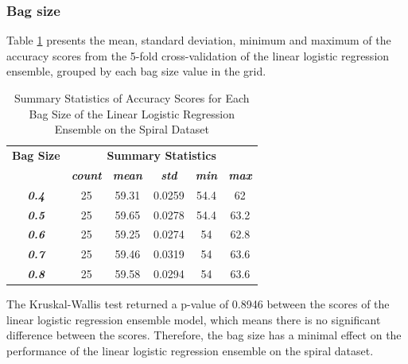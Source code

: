 \documentclass[10pt, conference]{IEEEtran}
\begin{document}
\subsubsection{Bag size}

Table \ref{table: S_bagsize_linear_performance_metrics} presents the mean, standard deviation, minimum and maximum of the
accuracy scores from the 5-fold cross-validation of the linear logistic regression ensemble, grouped by each bag size
value in the grid.
\begin{table}[H]
    \caption{Summary Statistics of Accuracy Scores for Each Bag Size of the Linear Logistic Regression Ensemble on the Spiral Dataset}
    \begin{center}
        \begin{tabular}{|c||c|c|c|c|c|}
            \hline
            \textbf{Bag Size}&\multicolumn{5}{|c|}{\textbf{Summary Statistics}} \\
            \cline{2-6}
                       &\textbf{\textit{count}} & \textbf{\textit{mean}} & \textbf{\textit{std}} & \textbf{\textit{min}} & \textbf{\textit{max}}\\
            \hline
            \textbf{\textit{0.4}} & 25 & 59.31 & 0.0259 & 54.4 & 62 \\
            \textbf{\textit{0.5}} & 25 & 59.65 & 0.0278 & 54.4 & 63.2 \\
            \textbf{\textit{0.6}} & 25 & 59.25 & 0.0274 & 54 & 62.8 \\
            \textbf{\textit{0.7}} & 25 & 59.46 & 0.0319 & 54 & 63.6 \\
            \textbf{\textit{0.8}} & 25 & 59.58 & 0.0294 & 54 & 63.6 \\
            \hline
        \end{tabular}
    \end{center}
    \label{table: S_bagsize_linear_performance_metrics}
\end{table}
The Kruskal-Wallis test returned a p-value of 0.8946 between the scores of the linear logistic regression ensemble model,
which means there is no significant difference between the scores. Therefore, the bag size has a minimal effect on the
performance of the linear logistic regression ensemble on the spiral dataset.
\end{document}
